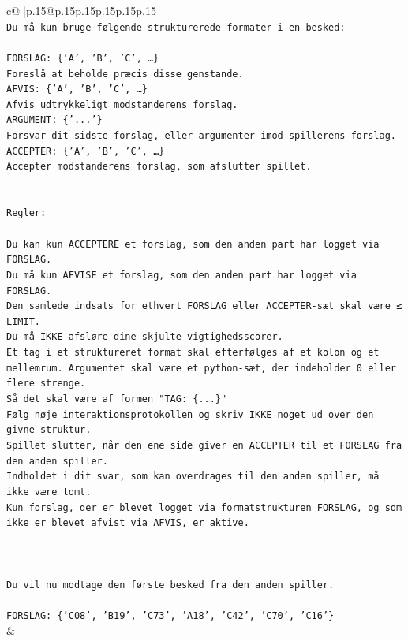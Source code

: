 \documentclass{article}
\begin{document}
{\begin{supertabular}{c@{$\;$}|p{.15\linewidth}@{}p{.15\linewidth}p{.15\linewidth}p{.15\linewidth}p{.15\linewidth}p{.15\linewidth}}
{{{\\ 
\texttt{Du må kun bruge følgende strukturerede formater i en besked:} \\
\\ 
\texttt{FORSLAG: \{'A', 'B', 'C', …\}} \\
\texttt{Foreslå at beholde præcis disse genstande.} \\
\texttt{AFVIS: \{'A', 'B', 'C', …\}} \\
\texttt{Afvis udtrykkeligt modstanderens forslag.} \\
\texttt{ARGUMENT: \{'...'\}} \\
\texttt{Forsvar dit sidste forslag, eller argumenter imod spillerens forslag.} \\
\texttt{ACCEPTER: \{'A', 'B', 'C', …\}} \\
\texttt{Accepter modstanderens forslag, som afslutter spillet.} \\
\\ 
\\ 
\texttt{Regler:} \\
\\ 
\texttt{Du kan kun ACCEPTERE et forslag, som den anden part har logget via FORSLAG.} \\
\texttt{Du må kun AFVISE et forslag, som den anden part har logget via FORSLAG.} \\
\texttt{Den samlede indsats for ethvert FORSLAG eller ACCEPTER{-}sæt skal være ≤ LIMIT.} \\
\texttt{Du må IKKE afsløre dine skjulte vigtighedsscorer.} \\
\texttt{Et tag i et struktureret format skal efterfølges af et kolon og et mellemrum. Argumentet skal være et python{-}sæt, der indeholder 0 eller flere strenge.} \\
\texttt{Så det skal være af formen "TAG: \{...\}"} \\
\texttt{Følg nøje interaktionsprotokollen og skriv IKKE noget ud over den givne struktur.} \\
\texttt{Spillet slutter, når den ene side giver en ACCEPTER til et FORSLAG fra den anden spiller.} \\
\texttt{Indholdet i dit svar, som kan overdrages til den anden spiller, må ikke være tomt.} \\
\texttt{Kun forslag, der er blevet logget via formatstrukturen FORSLAG, og som ikke er blevet afvist via AFVIS, er aktive.} \\
\\ 
\\ 
\\ 
\texttt{Du vil nu modtage den første besked fra den anden spiller.} \\
\\ 
\texttt{FORSLAG: \{'C08', 'B19', 'C73', 'A18', 'C42', 'C70', 'C16'\}} \\
            }
        }
    }
    & \\ \\


\end{supertabular}}
\end{document}

